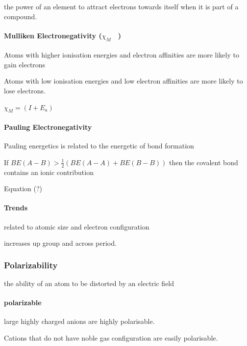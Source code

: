 \documentclass[]{article}
\let\oldparagraph\paragraph
\renewcommand{\paragraph}[1]{\oldparagraph{#1}\mbox{}}
\begin{document}
the power of an element to attract electrons towards itself when it is
part of a compound.

\paragraph{\texorpdfstring{Mulliken Electronegativity
(\(\chi_{M}\quad\))}{Mulliken Electronegativity (\textbackslash{}chi\_\{M\}\textbackslash{}quad)}}\label{mulliken-electronegativity-chi_mquad}

Atoms with higher ionisation energies and electron affinities are more
likely to gain electrons

Atoms with low ionisation energies and low electron affinities are more
likely to lose electrons.

\(\chi_{M}=(I+E_{a})\)

\paragraph{Pauling Electronegativity}\label{pauling-electronegativity}

Pauling energetics is related to the energetic of bond formation

If \(BE(A-B)>\frac{1}{2}(BE(A-A)+BE(B-B))\) then the covalent bond
contains an ionic contribution

Equation (?)

\paragraph{Trends}\label{trends-3}

related to atomic size and electron configuration

increases up group and across period.

\subsubsection{Polarizability}\label{polarizability}

the ability of an atom to be distorted by an electric field

\paragraph{polarizable}\label{polarizable}

large highly charged anions are highly polarisable.

Cations that do not have noble gas configuration are easily polarisable.
\end{document}
